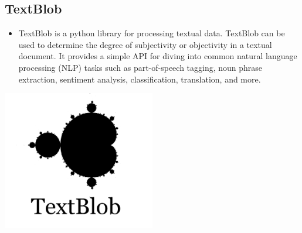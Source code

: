 \subsection{TextBlob}
\begin{minipage}{0.4\textwidth}
\begin{itemize}
\item[\textbf{\emph{}}] 
TextBlob is a python library for processing textual data. TextBlob can be used to determine the degree of subjectivity or objectivity in a textual document.
It provides a simple API for diving into common natural language processing (NLP) tasks such as part-of-speech tagging, noun phrase extraction, sentiment analysis, classification, translation, and more.\cite{ref43}
\end{itemize}
\end{minipage}%
%
\begin{minipage}{0.4\textwidth}
\begin{center}
    \includegraphics[width=0.5\textwidth]{images/textblob_logo}
    \label{img:g}
\end{center}
\end{minipage}


